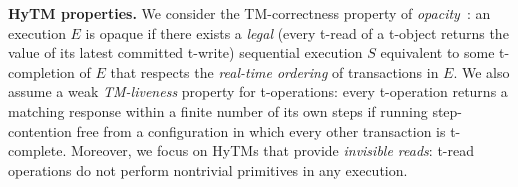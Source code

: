 %
\textbf{HyTM properties.}
We consider the TM-correctness property of \emph{opacity}~\cite{tm-book}: an execution
$E$ is opaque if there exists a \emph{legal} (every t-read of a t-object returns the value of its latest committed t-write) sequential execution $S$ equivalent to some t-completion of $E$
that respects the \emph{real-time ordering} of transactions in $E$.
We also assume a weak \emph{TM-liveness} property for t-operations: every t-operation returns a matching
response within a finite number of its own steps if running step-contention free from a configuration in which every other transaction is t-complete.
Moreover, we focus on HyTMs that provide \emph{invisible reads}: t-read operations do not perform
nontrivial primitives in any execution.
%
%
% 	 
%
